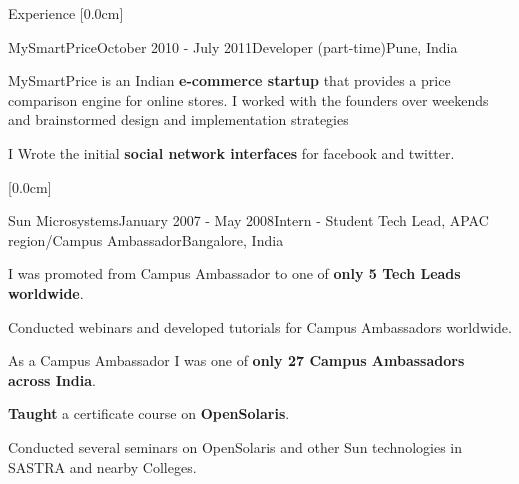 \documentclass{resume} %
\begin{document}
\begin{rSection}{Experience}
[0.0cm]
\begin{rSubsection}{MySmartPrice}{October 2010 - July 2011}{Developer (part-time)}{Pune, India}
\item MySmartPrice is an Indian \textbf{e-commerce startup} that provides a price comparison engine for online stores. 
I worked with the founders over weekends and brainstormed design and implementation strategies
\item I Wrote the initial \textbf{social network interfaces} for facebook and twitter. 
\end{rSubsection}

[0.0cm]
\begin{rSubsection}{Sun Microsystems}{January 2007 - May 2008}{Intern - Student Tech Lead, APAC region/Campus Ambassador}{Bangalore, India}
\item I was promoted from Campus Ambassador to one of \textbf{only 5 Tech Leads worldwide}.
\item Conducted webinars and developed tutorials for Campus Ambassadors worldwide.
\item As a Campus Ambassador I was one of \textbf{only 27 Campus Ambassadors across India}.
\item \textbf{Taught} a certificate course on \textbf{OpenSolaris}.
\item Conducted several seminars on OpenSolaris and other Sun technologies in SASTRA and nearby Colleges.
\end{rSubsection}
\end{rSection}

\end{document}
